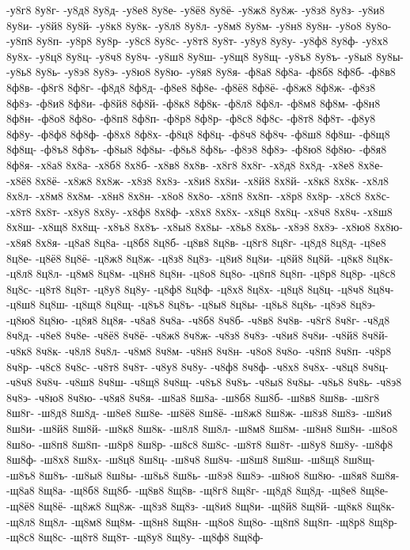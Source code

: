 {-у8г8
8у8г-
-у8д8
8у8д-
-у8е8
8у8е-
-у8ё8
8у8ё-
-у8ж8
8у8ж-
-у8з8
8у8з-
-у8и8
8у8и-
-у8й8
8у8й-
-у8к8
8у8к-
-у8л8
8у8л-
-у8м8
8у8м-
-у8н8
8у8н-
-у8о8
8у8о-
-у8п8
8у8п-
-у8р8
8у8р-
-у8с8
8у8с-
-у8т8
8у8т-
-у8у8
8у8у-
-у8ф8
8у8ф-
-у8х8
8у8х-
-у8ц8
8у8ц-
-у8ч8
8у8ч-
-у8ш8
8у8ш-
-у8щ8
8у8щ-
-у8ъ8
8у8ъ-
-у8ы8
8у8ы-
-у8ь8
8у8ь-
-у8э8
8у8э-
-у8ю8
8у8ю-
-у8я8
8у8я-
-ф8а8
8ф8а-
-ф8б8
8ф8б-
-ф8в8
8ф8в-
-ф8г8
8ф8г-
-ф8д8
8ф8д-
-ф8е8
8ф8е-
-ф8ё8
8ф8ё-
-ф8ж8
8ф8ж-
-ф8з8
8ф8з-
-ф8и8
8ф8и-
-ф8й8
8ф8й-
-ф8к8
8ф8к-
-ф8л8
8ф8л-
-ф8м8
8ф8м-
-ф8н8
8ф8н-
-ф8о8
8ф8о-
-ф8п8
8ф8п-
-ф8р8
8ф8р-
-ф8с8
8ф8с-
-ф8т8
8ф8т-
-ф8у8
8ф8у-
-ф8ф8
8ф8ф-
-ф8х8
8ф8х-
-ф8ц8
8ф8ц-
-ф8ч8
8ф8ч-
-ф8ш8
8ф8ш-
-ф8щ8
8ф8щ-
-ф8ъ8
8ф8ъ-
-ф8ы8
8ф8ы-
-ф8ь8
8ф8ь-
-ф8э8
8ф8э-
-ф8ю8
8ф8ю-
-ф8я8
8ф8я-
-х8а8
8х8а-
-х8б8
8х8б-
-х8в8
8х8в-
-х8г8
8х8г-
-х8д8
8х8д-
-х8е8
8х8е-
-х8ё8
8х8ё-
-х8ж8
8х8ж-
-х8з8
8х8з-
-х8и8
8х8и-
-х8й8
8х8й-
-х8к8
8х8к-
-х8л8
8х8л-
-х8м8
8х8м-
-х8н8
8х8н-
-х8о8
8х8о-
-х8п8
8х8п-
-х8р8
8х8р-
-х8с8
8х8с-
-х8т8
8х8т-
-х8у8
8х8у-
-х8ф8
8х8ф-
-х8х8
8х8х-
-х8ц8
8х8ц-
-х8ч8
8х8ч-
-х8ш8
8х8ш-
-х8щ8
8х8щ-
-х8ъ8
8х8ъ-
-х8ы8
8х8ы-
-х8ь8
8х8ь-
-х8э8
8х8э-
-х8ю8
8х8ю-
-х8я8
8х8я-
-ц8а8
8ц8а-
-ц8б8
8ц8б-
-ц8в8
8ц8в-
-ц8г8
8ц8г-
-ц8д8
8ц8д-
-ц8е8
8ц8е-
-ц8ё8
8ц8ё-
-ц8ж8
8ц8ж-
-ц8з8
8ц8з-
-ц8и8
8ц8и-
-ц8й8
8ц8й-
-ц8к8
8ц8к-
-ц8л8
8ц8л-
-ц8м8
8ц8м-
-ц8н8
8ц8н-
-ц8о8
8ц8о-
-ц8п8
8ц8п-
-ц8р8
8ц8р-
-ц8с8
8ц8с-
-ц8т8
8ц8т-
-ц8у8
8ц8у-
-ц8ф8
8ц8ф-
-ц8х8
8ц8х-
-ц8ц8
8ц8ц-
-ц8ч8
8ц8ч-
-ц8ш8
8ц8ш-
-ц8щ8
8ц8щ-
-ц8ъ8
8ц8ъ-
-ц8ы8
8ц8ы-
-ц8ь8
8ц8ь-
-ц8э8
8ц8э-
-ц8ю8
8ц8ю-
-ц8я8
8ц8я-
-ч8а8
8ч8а-
-ч8б8
8ч8б-
-ч8в8
8ч8в-
-ч8г8
8ч8г-
-ч8д8
8ч8д-
-ч8е8
8ч8е-
-ч8ё8
8ч8ё-
-ч8ж8
8ч8ж-
-ч8з8
8ч8з-
-ч8и8
8ч8и-
-ч8й8
8ч8й-
-ч8к8
8ч8к-
-ч8л8
8ч8л-
-ч8м8
8ч8м-
-ч8н8
8ч8н-
-ч8о8
8ч8о-
-ч8п8
8ч8п-
-ч8р8
8ч8р-
-ч8с8
8ч8с-
-ч8т8
8ч8т-
-ч8у8
8ч8у-
-ч8ф8
8ч8ф-
-ч8х8
8ч8х-
-ч8ц8
8ч8ц-
-ч8ч8
8ч8ч-
-ч8ш8
8ч8ш-
-ч8щ8
8ч8щ-
-ч8ъ8
8ч8ъ-
-ч8ы8
8ч8ы-
-ч8ь8
8ч8ь-
-ч8э8
8ч8э-
-ч8ю8
8ч8ю-
-ч8я8
8ч8я-
-ш8а8
8ш8а-
-ш8б8
8ш8б-
-ш8в8
8ш8в-
-ш8г8
8ш8г-
-ш8д8
8ш8д-
-ш8е8
8ш8е-
-ш8ё8
8ш8ё-
-ш8ж8
8ш8ж-
-ш8з8
8ш8з-
-ш8и8
8ш8и-
-ш8й8
8ш8й-
-ш8к8
8ш8к-
-ш8л8
8ш8л-
-ш8м8
8ш8м-
-ш8н8
8ш8н-
-ш8о8
8ш8о-
-ш8п8
8ш8п-
-ш8р8
8ш8р-
-ш8с8
8ш8с-
-ш8т8
8ш8т-
-ш8у8
8ш8у-
-ш8ф8
8ш8ф-
-ш8х8
8ш8х-
-ш8ц8
8ш8ц-
-ш8ч8
8ш8ч-
-ш8ш8
8ш8ш-
-ш8щ8
8ш8щ-
-ш8ъ8
8ш8ъ-
-ш8ы8
8ш8ы-
-ш8ь8
8ш8ь-
-ш8э8
8ш8э-
-ш8ю8
8ш8ю-
-ш8я8
8ш8я-
-щ8а8
8щ8а-
-щ8б8
8щ8б-
-щ8в8
8щ8в-
-щ8г8
8щ8г-
-щ8д8
8щ8д-
-щ8е8
8щ8е-
-щ8ё8
8щ8ё-
-щ8ж8
8щ8ж-
-щ8з8
8щ8з-
-щ8и8
8щ8и-
-щ8й8
8щ8й-
-щ8к8
8щ8к-
-щ8л8
8щ8л-
-щ8м8
8щ8м-
-щ8н8
8щ8н-
-щ8о8
8щ8о-
-щ8п8
8щ8п-
-щ8р8
8щ8р-
-щ8с8
8щ8с-
-щ8т8
8щ8т-
-щ8у8
8щ8у-
-щ8ф8
8щ8ф-
}
